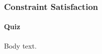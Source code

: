\documentclass{ltx-talk}
\begin{document}
\begin{frame}[vertical-alignment=center]
\frametitle{Constraint Satisfaction}
\framesubtitle{Quiz}
Body text.
\end{frame}
\end{document}
